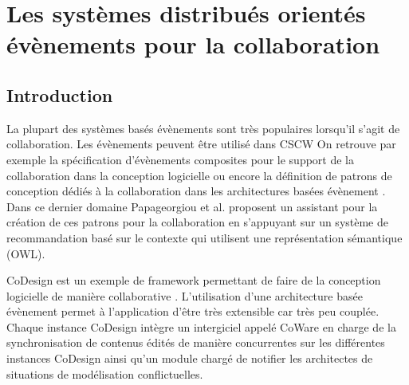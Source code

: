 
\section{Les systèmes distribués orientés évènements pour la collaboration}

	\subsection{Introduction}
La plupart des systèmes basés évènements sont très populaires lorsqu'il s'agit de 
collaboration\cite{Helmer2011}. Les évènements peuvent être utilisé dans 
\gls{CSCW}
On retrouve par exemple la spécification 
d'évènements composites 
pour le support de la collaboration dans la conception logicielle \cite{Yuan2002} 
ou encore la définition de patrons de conception dédiés à la collaboration dans les 
architectures basées évènement \cite{Verginadis2009}. Dans ce dernier domaine 
Papageorgiou et al. \cite{Papageorgiou2011} proposent un assistant pour la 
création de ces patrons pour la collaboration en s'appuyant sur un système de 
recommandation basé sur le contexte qui utilisent une représentation sémantique 
(\gls{OWL}).

CoDesign est un exemple de \gls{framework} permettant de faire de la 
conception logicielle de manière collaborative \cite{Bang2010}. L'utilisation d'une 
architecture basée évènement permet à l'application d'être très extensible car très 
peu couplée. Chaque instance CoDesign intègre un intergiciel appelé CoWare en 
charge de la synchronisation de contenus édités de manière concurrentes sur les 
différentes instances CoDesign ainsi qu'un module chargé de notifier les 
architectes de situations de modélisation conflictuelles. 

